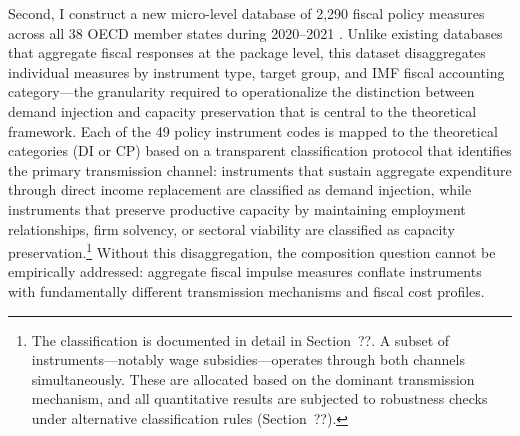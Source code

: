 Second, I construct a new micro-level database of 2,290 fiscal policy measures across
all 38 OECD member states during 2020--2021 \citep{pesenti2025}. Unlike existing
databases that aggregate fiscal responses at the package level, this dataset
disaggregates individual measures by instrument type, target group, and IMF fiscal
accounting category---the granularity required to operationalize the distinction
between demand injection and capacity preservation that is central to the theoretical
framework. Each of the 49 policy instrument codes is mapped to the theoretical
categories (DI or CP) based on a transparent classification protocol that identifies
the primary transmission channel: instruments that sustain aggregate expenditure
through direct income replacement are classified as demand injection, while
instruments that preserve productive capacity by maintaining employment relationships,
firm solvency, or sectoral viability are classified as capacity
preservation.\footnote{The classification is documented in detail in Section~??. A
subset of instruments---notably wage subsidies---operates through both channels
simultaneously. These are allocated based on the dominant transmission mechanism, and
all quantitative results are subjected to robustness checks under alternative
classification rules (Section~??).} Without this disaggregation, the composition
question cannot be empirically addressed: aggregate fiscal impulse measures conflate
instruments with fundamentally different transmission mechanisms and fiscal cost
profiles.

